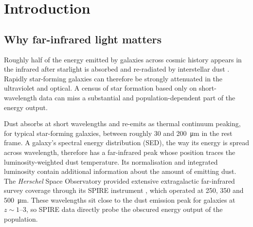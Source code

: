 \documentclass[12pt,a4paper]{article}
\begin{document}
\begin{abstract}
The matched-object test reveals a second weakness. At the conservative
$\mathrm{SNR}\geq5$ cut, median model fluxes are too faint by 0.20--\SI{0.31}{dex},
while the noise-deconvolved object-to-object scatter is 0.45--\SI{0.52}{dex}. Wang and
Jin agree with each other to 0.12--\SI{0.15}{dex}, showing that differences between
those two deblending catalogues cannot
account for most of this spread. In a steep flux distribution, the model scatter moves
many more faint galaxies into brighter bins than the reverse. A decomposition on the
wider $\mathrm{SNR}\geq3$ sample finds count inflation of 0.55--\SI{0.86}{dex}. It
accounts for the measured excess at \SI{250}{\um}, but leaves residual excesses of
0.20 and \SI{0.15}{dex} at 350 and \SI{500}{\um}.
The main recommendation is to keep the learned population and energy balance,
but to add a galaxy-dependent FIR dust family and validate both population counts
and individual-object scatter on held-out survey fields.
\end{abstract}

\section{Introduction}
\label{sec:intro}

\subsection{Why far-infrared light matters}
\label{sec:intro:fir}

Roughly half of the energy emitted by galaxies across cosmic history appears in the
infrared after starlight is absorbed and re-radiated by interstellar dust
\citep{Dole_2006}. Rapidly star-forming galaxies can therefore be strongly attenuated in
the ultraviolet and optical. A census of star formation based only on short-wavelength
data can miss a substantial and population-dependent part of the energy output.

Dust absorbs at short wavelengths and re-emits as thermal continuum peaking, for
typical star-forming galaxies, between roughly 30 and \SI{200}{\um} in the rest frame.
A galaxy's spectral energy distribution (SED), the way its energy is spread across
wavelength, therefore has a far-infrared peak whose position traces the luminosity-weighted
dust temperature. Its normalisation and integrated luminosity contain additional
information about the amount of emitting dust. The
\emph{Herschel} Space Observatory \citep{Pilbratt_2010} provided extensive
extragalactic far-infrared survey coverage through its SPIRE instrument
\citep{Griffin_2010}, which operated at 250, 350 and \SI{500}{\um}. These
wavelengths sit close to the dust emission peak for galaxies at $z \sim 1$--$3$, so
SPIRE data directly probe the obscured energy output of the population.
\end{document}
